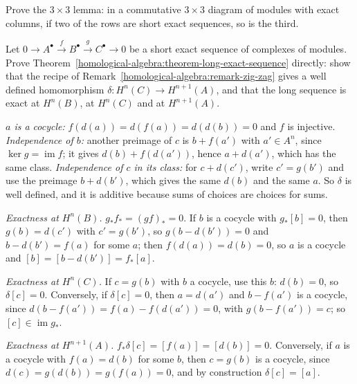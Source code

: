 \begin{exercise}\label{homological-algebra:exercise-nine-lemma}
Prove the $3 \times 3$ lemma: in a commutative $3 \times 3$ diagram of modules with exact columns, if two of the rows are short exact
sequences, so is the third.
\end{exercise}

\begin{exercise}\label{homological-algebra:exercise-zig-zag}
Let $0 \to A^\bullet \xrightarrow{f} B^\bullet \xrightarrow{g} C^\bullet \to 0$ be a short exact sequence of complexes of modules.
Prove Theorem~\ref{homological-algebra:theorem-long-exact-sequence} directly: show that the recipe of
Remark~\ref{homological-algebra:remark-zig-zag} gives a well defined homomorphism $\delta \colon H^n(C) \to H^{n+1}(A)$, and that
the long sequence is exact at $H^n(B)$, at $H^n(C)$ and at $H^{n+1}(A)$.
\end{exercise}

\begin{solution}
\emph{$a$ is a cocycle:} $f(d(a)) = d(f(a)) = d(d(b)) = 0$ and $f$ is injective. \emph{Independence of $b$:} another preimage
of $c$ is $b + f(a')$ with $a' \in A^n$, since $\ker g = \operatorname{im} f$; it gives $d(b) + f(d(a'))$, hence $a + d(a')$, which has
the same class. \emph{Independence of $c$ in its class:} for $c + d(c')$, write $c' = g(b')$ and use the preimage $b + d(b')$, which
gives the same $d(b)$ and the same $a$. So $\delta$ is well defined, and it is additive because sums of choices are choices for
sums.

\emph{Exactness at $H^n(B)$.} $g_*f_* = (gf)_* = 0$. If $b$ is a cocycle with $g_*[b] = 0$, then $g(b) = d(c')$ with $c' = g(b')$,
so $g(b - d(b')) = 0$ and $b - d(b') = f(a)$ for some $a$; then $f(d(a)) = d(b) = 0$, so $a$ is a cocycle and
$[b] = [b - d(b')] = f_*[a]$.

\emph{Exactness at $H^n(C)$.} If $c = g(b)$ with $b$ a cocycle, use this $b$: $d(b) = 0$, so $\delta[c] = 0$. Conversely, if
$\delta[c] = 0$, then $a = d(a')$ and $b - f(a')$ is a cocycle, since $d(b - f(a')) = f(a) - f(d(a')) = 0$, with
$g(b - f(a')) = c$; so $[c] \in \operatorname{im} g_*$.

\emph{Exactness at $H^{n+1}(A)$.} $f_*\delta[c] = [f(a)] = [d(b)] = 0$. Conversely, if $a$ is a cocycle with $f(a) = d(b)$ for some
$b$, then $c = g(b)$ is a cocycle, since $d(c) = g(d(b)) = g(f(a)) = 0$, and by construction $\delta[c] = [a]$.
\end{solution}

